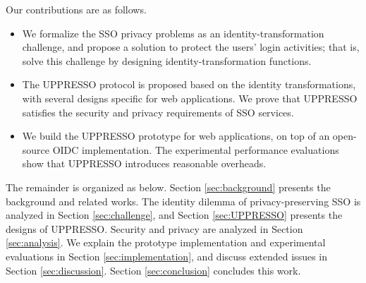 %
%
Our contributions are as follows.
\vspace{-\topsep}\begin{itemize}
\setlength{\topsep}{0pt}
\setlength{\partopsep}{0pt}
\setlength{\itemsep}{0pt}
\setlength{\parsep}{0pt}
\setlength{\parskip}{0pt}
\item We formalize the SSO privacy problems as an identity-transformation challenge,
    and
propose a  solution to protect the users' login activities;
    that is, solve this challenge by designing identity-transformation functions.
\item
The UPPRESSO protocol is proposed based on the identity transformations,
    with several designs specific for web applications.
We prove that UPPRESSO satisfies the security and privacy requirements of SSO services.


\item
We build the UPPRESSO prototype for web applications,
    on top of an open-source OIDC implementation.
The experimental performance evaluations show that UPPRESSO introduces reasonable overheads.
\end{itemize}


The remainder is organized as below.
Section \ref{sec:background} presents
    the background and related works.
The identity dilemma of privacy-preserving SSO is analyzed  in Section \ref{sec:challenge},
    and Section \ref{sec:UPPRESSO} presents the designs of UPPRESSO.
Security and privacy are analyzed in Section \ref{sec:analysis}.
We explain the prototype implementation and experimental evaluations in Section \ref{sec:implementation},
 and discuss extended issues in Section \ref{sec:discussion}.
Section \ref{sec:conclusion} concludes this work.
